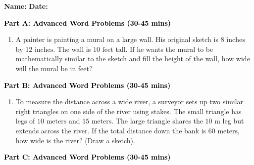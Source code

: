 \documentclass[12pt, letterpaper, fleqn]{article}
\begin{document}
\textbf{Name:} \underline{\hspace{5cm}}
\hfill
\textbf{Date:} \underline{\hspace{3cm}}\\


\begin{tcolorbox}[colback=customteal!20]
\large\textcolor{black}{\textbf{Part A: Advanced Word Problems (30-45 mins)}}
\end{tcolorbox}

\vspace{3mm}

\begin{enumerate}[itemsep=5.5cm, leftmargin=0.6cm]
\item A painter is painting a mural on a large wall. His original sketch is $8\text{ inches}$ by $12\text{ inches}$. The wall is $10\text{ feet}$ tall. If he wants the mural to be mathematically similar to the sketch and fill the height of the wall, how wide will the mural be in feet?
\end{enumerate}

\newpage

\begin{tcolorbox}[colback=customteal!20]
\large\textcolor{black}{\textbf{Part B: Advanced Word Problems (30-45 mins)}}
\end{tcolorbox}

\vspace{3mm}

\begin{enumerate}[itemsep=5.5cm, leftmargin=0.6cm, resume]
\item To measure the distance across a wide river, a surveyor sets up two similar right triangles on one side of the river using stakes. The small triangle has legs of $10\text{ meters}$ and $15\text{ meters}$. The large triangle shares the $10\text{ m}$ leg but extends across the river. If the total distance down the bank is $60\text{ meters}$, how wide is the river? (Draw a sketch).
\end{enumerate}

\newpage

\begin{tcolorbox}[colback=customteal!20]
\large\textcolor{black}{\textbf{Part C: Advanced Word Problems (30-45 mins)}}
\end{tcolorbox}

\vspace{3mm}
\end{document}
